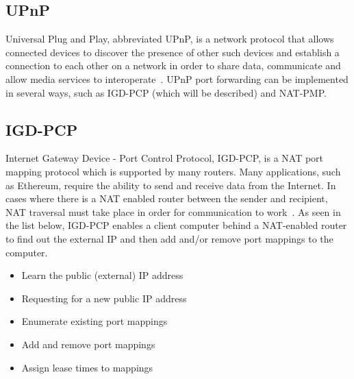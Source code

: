 \subsection{UPnP}
Universal Plug and Play, abbreviated UPnP, is a network protocol that allows connected devices to discover the presence of other such devices and establish a connection to each other on a network in order to share data, communicate and allow media services to interoperate~\cite{kurose:p352}. UPnP port forwarding can be implemented in several ways, such as IGD-PCP (which will be described) and NAT-PMP.

\subsection{IGD-PCP}
Internet Gateway Device - Port Control Protocol, IGD-PCP, is a NAT port mapping protocol which is supported by many routers. Many applications, such as Ethereum, require the ability to send and receive data from the Internet. In cases where there is a NAT enabled router between the sender and recipient, NAT traversal must take place in order for communication to work~\cite{igd-pcp:rfc}. As seen in the list below, IGD-PCP enables a client computer behind a NAT-enabled router to find out the external IP and then add and/or remove port mappings to the computer. 

\begin{itemize}
    \item Learn the public (external) IP address
    \item Requesting for a new public IP address
    \item Enumerate existing port mappings
    \item Add and remove port mappings
    \item Assign lease times to mappings
\end{itemize}